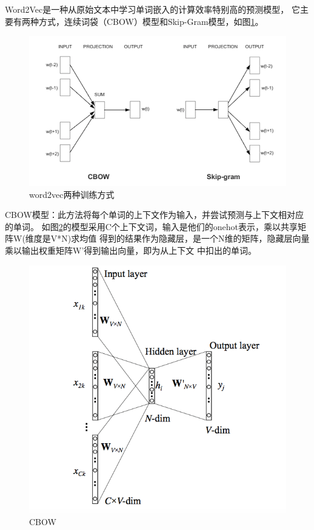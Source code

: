  Word2Vec是一种从原始文本中学习单词嵌入的计算效率特别高的预测模型，
它主要有两种方式，连续词袋（CBOW）模型和Skip-Gram模型，如图\ref{fig:word2vec_diagrams}。
\begin{figure}[htbp]
  \centering
  \includegraphics[scale=0.5]{./images/word2vec_diagrams.png}
  \caption{word2vec两种训练方式}
  \label{fig:word2vec_diagrams}
\end{figure}
CBOW模型：此方法将每个单词的上下文作为输入，并尝试预测与上下文相对应的单词。
如图\ref{fig:CBOW}的模型采用C个上下文词，输入是他们的onehot表示，乘以共享矩阵W(维度是V*N)求均值
得到的结果作为隐藏层，是一个N维的矩阵，隐藏层向量乘以输出权重矩阵W'得到输出向量，即为从上下文
中扣出的单词。


\begin{figure}[htbp]
  \centering
  \includegraphics[scale=0.4]{./images/CBOW.jpg}
  \caption{CBOW}
  \label{fig:CBOW}
\end{figure}


